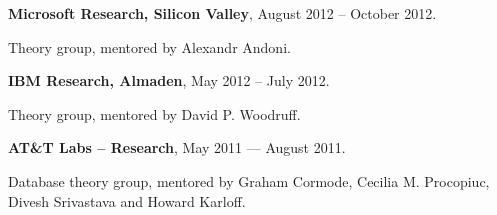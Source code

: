\documentclass[11pt]{article}
\newenvironment{innerlist}[1][\enskip\textbullet]%
        {\begin{compactitem}[#1]}{\end{compactitem}}
\begin{document}
\textbf{Microsoft Research, Silicon Valley},  August 2012 -- October 2012.

Theory group, mentored by Alexandr Andoni.
\begin{comment}
\begin{innerlist}
\item MapReduce algorithms for large-scale geometric problems, including minimum-spanning trees, single-linkage clustering and bichromatic matching  (with A. Andoni, A. Nikolov and K. Onak, STOC'14).
\end{innerlist}
\end{comment}
\medskip

\textbf{IBM Research, Almaden},  May 2012 -- July 2012.

Theory group, mentored by David P. Woodruff. 
\begin{comment}
\begin{innerlist}
\item Optimal bounds on one-way communication and space complexity of sketching multiple instances of data  (with M. Molinaro and D. Woodruff, SODA'13). 
\item A protocol for computing the intersection of distributed databases with almost optimal round vs. communication tradeoffs  (with D. Woodruff, PODC'14; U.S. patent pending).
\end{innerlist}
\end{comment}
\medskip

\textbf{AT\&T Labs -- Research},  May 2011 --- August 2011.

Database theory group, mentored by Graham Cormode, Cecilia M. Procopiuc, Divesh Srivastava and Howard Karloff.

\begin{comment}
\begin{innerlist}
\item Design and implementation of efficient differentially private mechanisms for linear queries
 (with G. Cormode, M. Procopiuc and D. Srivastava, ICDE'13) %
\end{innerlist}
\end{comment}
\end{document}
